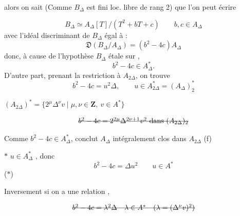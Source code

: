 \documentclass[11pt,a4paper]{article}
\begin{document}
alors on sait (Comme $B_\Delta$ est fini loc. libre de rang 2) que l'on peut écrire

\[
  B_\Delta \simeq A_\Delta[T] / (T^2 + bT + c) \qquad b, c \in A_\Delta
\]
avec l'idéal discriminant de $B_\Delta$ égal à :
\[
  \mathfrak{D}(B_\Delta / A_\Delta) = (b^2 - 4c) A_\Delta
\]
donc, à cause de l'hypothèse $B_\Delta$ étale sur ,
\[
  b^2 - 4c \in A_\Delta^* .
\]
D'autre part, prenant la restriction à $A_{2\Delta}$, on trouve
\[
  b^2 - 4c = u^2 \Delta , \qquad u \in A_{2\Delta}^* = (A_\Delta)_2^*
\]


 $(A_{2\Delta})^* = \{ 2^\mu \Delta^\nu v \mid \mu, \nu \in \mathbf{Z},\ v \in A^* \}$ \struck{(\ill{})}

\[
  \text{\struck{$b^2 - 4c = 2^{2\mu} \Delta^{2\nu + 1} v^2$ dans $(A_{2\Delta})_2$}}
\]

Comme $b^2 - 4c \in A_\Delta^*$, \ill{} conclut   \struck{(\ill{})} $A_\Delta$ intégralement clos dans $A_{2\Delta}$ (f)

$*$ $u \in A_\Delta^*$ , donc
\[
  b^2 - 4c = \Delta u^2 \qquad u \in A^*
\]
($*$)

Inversement si on a une relation \ill{}, \ill{}

  
\[
  \text{\struck{$b^2 - 4c = \lambda^2 \Delta \quad \lambda \in A^* \quad (\lambda = (\Delta^\nu v)^2)$}}
\]
\end{document}
